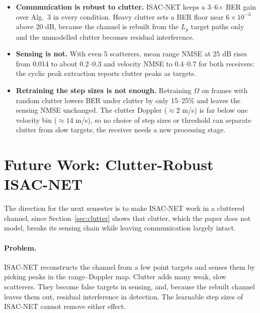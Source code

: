 \documentclass[11pt,a4paper]{article}
\newcommand{\sci}[2]{\ensuremath{#1\times10^{#2}}}
\begin{document}
\begin{itemize}
  \item \textbf{Communication is robust to clutter.} ISAC-NET keeps a 3--6$\times$ BER gain over Alg.~3 in every condition. Heavy clutter sets a BER floor near \sci{6}{-3} above 20 dB, because the channel is rebuilt from the $L_p$ target paths only and the unmodelled clutter becomes residual interference.
  \item \textbf{Sensing is not.} With even 5 scatterers, mean range NMSE at 25 dB rises from 0.014 to about 0.2--0.3 and velocity NMSE to 0.4--0.7 for both receivers: the cyclic peak extraction reports clutter peaks as targets.
  \item \textbf{Retraining the step sizes is not enough.} Retraining $\Omega$ on frames with random clutter lowers BER under clutter by only 15--25\% and leaves the sensing NMSE unchanged. The clutter Doppler ($\approx2$ m/s) is far below one velocity bin ($\approx14$ m/s), so no choice of step sizes or threshold can separate clutter from slow targets; the receiver needs a new processing stage.
\end{itemize}

\section{Future Work: Clutter-Robust ISAC-NET}\label{sec:future}
The direction for the next semester is to make ISAC-NET work in a cluttered channel, since Section~\ref{sec:clutter} shows that clutter, which the paper does not model, breaks its sensing chain while leaving communication largely intact.

\paragraph{Problem.} ISAC-NET reconstructs the channel from a few point targets and senses them by picking peaks in the range--Doppler map. Clutter adds many weak, slow scatterers. They become false targets in sensing, and, because the rebuilt channel leaves them out, residual interference in detection. The learnable step sizes of ISAC-NET cannot remove either effect.
\end{document}
